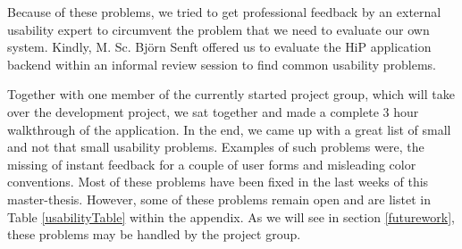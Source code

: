 Because of these problems, we tried to get professional feedback by an external usability expert to circumvent the problem that we need to evaluate our own system. Kindly, M. Sc. Bj\"orn Senft offered us to evaluate the \ac{HiP} application backend within an informal review session to find common usability problems. 

Together with one member of the currently started project group, which will take over the development project, we sat together and made a complete 3 hour walkthrough of the application. In the end, we came up with a great list of small and not that small usability problems. Examples of such problems were, the missing of instant feedback for a couple of user forms and misleading color conventions. Most of these problems have been fixed in the last weeks of this master-thesis. However, some of these problems remain open and are listet in Table \ref{usabilityTable} within the appendix. As we will see in section \ref{futurework}, these problems may be handled by the project group.

